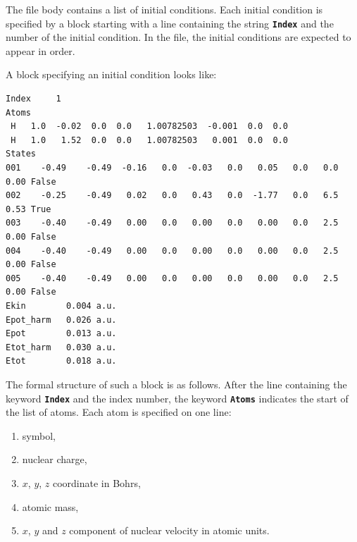 \documentclass[a4paper,10pt,DIV=15,openany,twoside=false]{scrbook}
\newcommand{\ttt}[1]{\textbf{\texttt{#1}}}
\newenvironment{example}{
  \setlength{\OuterFrameSep}{3pt}
  \vspace{0mm}
  \definecolor{shadecolor}{HTML}{E4F4FF}
  \begin{shaded}
}{
  \end{shaded}
}
\begin{document}
The file body contains a list of initial conditions. Each initial condition is specified by a block starting with a line containing the string \ttt{Index} and the number of the initial condition. In the file, the initial conditions are expected to appear in order.

A block specifying an initial condition looks like:
\begin{example}
\footnotesize\begin{verbatim}
Index     1
Atoms
 H   1.0  -0.02  0.0  0.0   1.00782503  -0.001  0.0  0.0
 H   1.0   1.52  0.0  0.0   1.00782503   0.001  0.0  0.0
States
001    -0.49    -0.49  -0.16   0.0  -0.03   0.0   0.05   0.0   0.0   0.00 False
002    -0.25    -0.49   0.02   0.0   0.43   0.0  -1.77   0.0   6.5   0.53 True
003    -0.40    -0.49   0.00   0.0   0.00   0.0   0.00   0.0   2.5   0.00 False
004    -0.40    -0.49   0.00   0.0   0.00   0.0   0.00   0.0   2.5   0.00 False
005    -0.40    -0.49   0.00   0.0   0.00   0.0   0.00   0.0   2.5   0.00 False
Ekin        0.004 a.u.
Epot_harm   0.026 a.u.
Epot        0.013 a.u.
Etot_harm   0.030 a.u.
Etot        0.018 a.u.
\end{verbatim}
\end{example}
The formal structure of such a block is as follows. After the line containing the keyword \ttt{Index} and the index number, the keyword \ttt{Atoms} indicates the start of the list of atoms. Each atom is specified on one line:
\begin{enumerate}
  \item symbol,
  \item nuclear charge,
  \item $x$, $y$, $z$ coordinate in Bohrs,
  \item atomic mass,
  \item $x$, $y$ and $z$ component of nuclear velocity in atomic units.
\end{enumerate}
\end{document}
